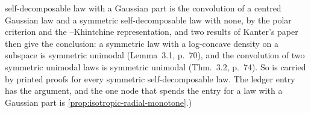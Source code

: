 \begin{theorem}
{self-decomposable law with a Gaussian part is the convolution of a centred Gaussian law and a
symmetric self-decomposable law with none, by the polar criterion and the \Levy--Khintchine
representation, and two results of Kanter's paper then give the conclusion: a symmetric law with a
log-concave density on a subspace is symmetric unimodal (Lemma~3.1, p.~70), and the convolution of
two symmetric unimodal laws is symmetric unimodal (Thm.~3.2, p.~74). So  is carried by
printed proofs for every symmetric self-decomposable law. The ledger entry has the argument, and
the one node that spends the entry for a law with a Gaussian part is
\ref{prop:isotropic-radial-monotone}.)}
\end{theorem}

